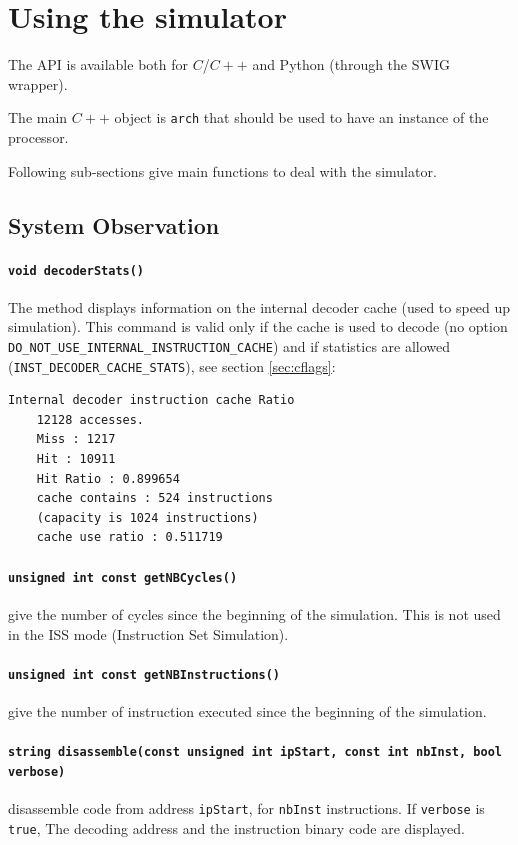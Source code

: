 \section{Using the simulator}
The API is available both for $C$/$C++$ and Python (through the SWIG wrapper).

The main $C++$ object is \texttt{arch} that should be used to have an instance of the processor.

Following sub-sections give main functions to deal with the simulator.
\subsection{System Observation}

\paragraph{\texttt{void decoderStats()}}
The method displays information on the internal decoder cache (used to speed up simulation). This command is valid only if the cache is used to decode (no option \texttt{DO\_NOT\_USE\_INTERNAL\_INSTRUCTION\_CACHE}) and if statistics are allowed (\texttt{INST\_DECODER\_CACHE\_STATS}), see section \ref{sec:cflags}:
\begin{verbatim}
Internal decoder instruction cache Ratio
    12128 accesses.
    Miss : 1217
    Hit : 10911
    Hit Ratio : 0.899654
    cache contains : 524 instructions
    (capacity is 1024 instructions)
    cache use ratio : 0.511719
\end{verbatim}

\paragraph{\texttt{unsigned int const getNBCycles()}} give the number of cycles since the beginning of the simulation. This is not used in the ISS mode (Instruction Set Simulation).
\paragraph{\texttt{unsigned int const getNBInstructions()}} give the number of instruction executed since the beginning of the simulation.
\paragraph{\texttt{string disassemble(const unsigned int ipStart, const int nbInst, bool verbose)}} disassemble code from address
\texttt{ipStart}, for \texttt{nbInst} instructions. If \texttt{verbose} is \texttt{true}, The decoding address and the instruction binary code are displayed.

